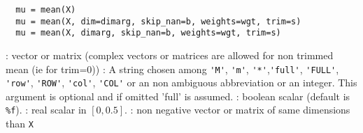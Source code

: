 
\begin{mandesc}
\end{mandesc}

\begin{calling_sequence}
\begin{verbatim}
  mu = mean(X)
  mu = mean(X, dim=dimarg, skip_nan=b, weights=wgt, trim=s)  
  mu = mean(X, dimarg, skip_nan=b, weights=wgt, trim=s)  
\end{verbatim}
\end{calling_sequence}
\begin{parameters}
  \begin{varlist}
    : vector or matrix (complex vectors or matrices are allowed for non trimmed mean (ie for trim=0))
    : A string chosen among \verb+'M'+, \verb+'m'+, \verb+'*'+,\verb+'full'+, \verb+'FULL'+, \verb+'row'+,
    \verb+'ROW'+, \verb+'col'+, \verb+'COL'+ or an non ambiguous abbreviation or an integer. 
    This argument is optional and if omitted 'full' is assumed.
    : boolean scalar (default is \verb+%f+).
    : real scalar in $[0,0.5]$.
    : non negative vector or matrix of same dimensions than \verb+X+
  \end{varlist}
\end{parameters}

